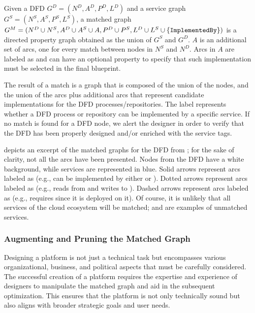 \begin{definition}
\label{def:pdd-match}
Given a DFD $G^D = (N^D, A^D, P^D, L^D)$ and a service graph $G^S = (N^S, A^S, P^S, L^S)$, a matched graph $G^M = (N^D \cup N^S, A^D \cup A^S \cup A, P^D \cup P^S, L^D \cup L^S \cup \{\texttt{ImplementedBy}\})$ is a directed property graph obtained as the union of $G^S$ and $G^D$. $A$ is an additional set of arcs, one for every match between nodes in $N^S$ and $N^D$. Arcs in $A$ are labeled as  and can have an optional property  to specify that such implementation must be selected in the final blueprint.
\end{definition}

The result of a match is a graph that is composed of the union of the nodes, and the union of the arcs plus additional arcs that represent candidate implementations for the DFD processes/repositories. The label  represents whether a DFD process or repository can be implemented by a specific service. If no match is found for a DFD node, we alert the designer in order to verify that the DFD has been properly designed and/or enriched with the service tags.

\begin{example}
 depicts an excerpt of the matched graphs for the DFD from ; for the sake of clarity, not all the arcs have been presented. Nodes from the DFD have a white background, while services are represented in blue. Solid arrows represent arcs labeled as  (e.g.,  can be implemented by either  or ). Dotted arrows represent arcs labeled as  (e.g.,  reads from and writes to ). Dashed arrows represent arcs labeled as  (e.g.,  requires  since it is deployed on it). Of course, it is unlikely that all services of the cloud ecosystem will be matched;  and  are examples of unmatched services.
\end{example}

\subsubsection{Augmenting and Pruning the Matched Graph}

Designing a platform is not just a technical task but encompasses various organizational, business, and political aspects that must be carefully considered. The successful creation of a platform requires the expertise and experience of designers to manipulate the matched graph and aid in the subsequent optimization. This ensures that the platform is not only technically sound but also aligns with broader strategic goals and user needs.


